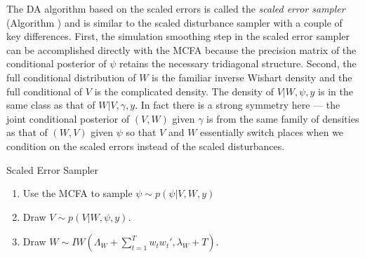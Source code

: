 \documentclass[12pt]{article}
\begin{document}
The DA algorithm based on the scaled errors is called the {\it scaled error sampler} (Algorithm ) and is similar to the scaled disturbance sampler with a couple of key differences. First, the simulation smoothing step in the scaled error sampler can be accomplished directly with the MCFA because the precision matrix of the conditional posterior of $\psi$ retains the necessary tridiagonal structure. Second, the full conditional distribution of $W$ is the familiar inverse Wishart density and the full conditional of $V$ is the complicated density. The density of $V|W,\psi,y$ is in the same class as that of $W|V,\gamma,y$. In fact there is a strong symmetry here --- the joint conditional posterior of $(V,W)$ given $\gamma$ is from the same family of densities as that of $(W,V)$ given $\psi$ so that $V$ and $W$ essentially switch places when we condition on the scaled errors instead of the scaled disturbances.
\begin{alg*}[SE]Scaled Error Sampler\label{alg:DLMerror}
\begin{enumerate}
\item Use the MCFA to sample $\psi \sim  p(\psi|V,W,y)$
\item Draw $V \sim p(V|W,\psi,y)$.
\item Draw $W \sim IW\left(\Lambda_W + \sum_{t=1}^Tw_tw_t',\lambda_{W} + T\right)$.
\end{enumerate}
\end{alg*}
\end{document}
